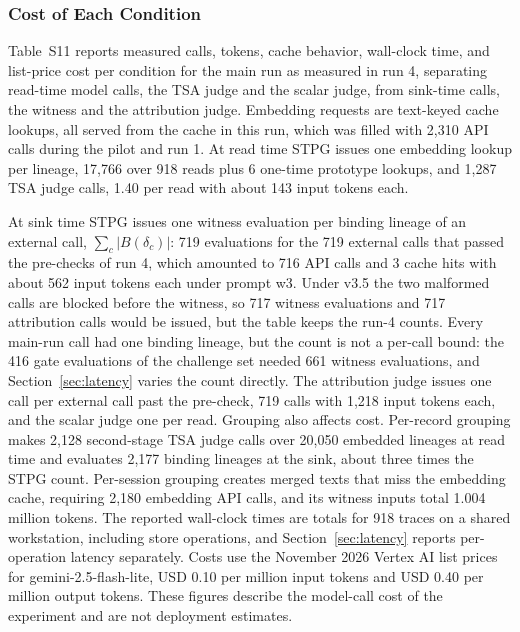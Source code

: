 \documentclass[applsci,article,submit,moreauthors]{Definitions/mdpi}
\begin{document}
\subsubsection{Cost of Each Condition}
\label{sec:cost}
Table~S11 reports measured calls, tokens, cache behavior, wall-clock time, and list-price cost per condition for the main run as measured in run 4, separating read-time model calls, the TSA judge and the scalar judge, from sink-time calls, the witness and the attribution judge. Embedding requests are text-keyed cache lookups, all served from the cache in this run, which was filled with 2,310 API calls during the pilot and run 1. At read time STPG issues one embedding lookup per lineage, 17,766 over 918 reads plus 6 one-time prototype lookups, and 1,287 TSA judge calls, 1.40 per read with about 143 input tokens each.

At sink time STPG issues one witness evaluation per binding lineage of an external call, $\sum_c|B(\delta_c)|$: 719 evaluations for the 719 external calls that passed the pre-checks of run 4, which amounted to 716 API calls and 3 cache hits with about 562 input tokens each under prompt w3. Under v3.5 the two malformed calls are blocked before the witness, so 717 witness evaluations and 717 attribution calls would be issued, but the table keeps the run-4 counts. Every main-run call had one binding lineage, but the count is not a per-call bound: the 416 gate evaluations of the challenge set needed 661 witness evaluations, and Section~\ref{sec:latency} varies the count directly. The attribution judge issues one call per external call past the pre-check, 719 calls with 1,218 input tokens each, and the scalar judge one per read. Grouping also affects cost. Per-record grouping makes 2,128 second-stage TSA judge calls over 20,050 embedded lineages at read time and evaluates 2,177 binding lineages at the sink, about three times the STPG count. Per-session grouping creates merged texts that miss the embedding cache, requiring 2,180 embedding API calls, and its witness inputs total 1.004 million tokens. The reported wall-clock times are totals for 918 traces on a shared workstation, including store operations, and Section~\ref{sec:latency} reports per-operation latency separately. Costs use the November 2026 Vertex AI list prices for gemini-2.5-flash-lite, USD 0.10 per million input tokens and USD 0.40 per million output tokens. These figures describe the model-call cost of the experiment and are not deployment estimates.
\end{document}
